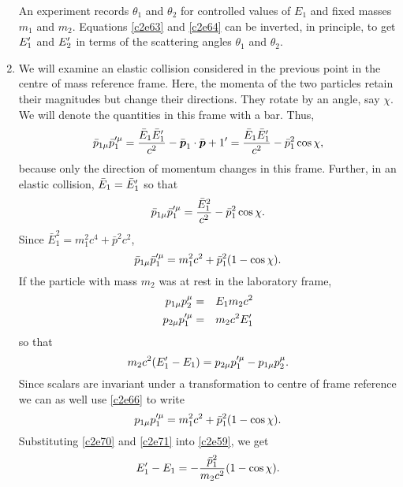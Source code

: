 \begin{enumerate}
An experiment records $\theta_1$ and $\theta_2$ for controlled values of $E_1$
and fixed masses $m_1$ and $m_2$. Equations \eqref{c2e63} and \eqref{c2e64}
can be inverted, in principle, to get $E_1^\prime$ and $E_2^\prime$ in terms of
the scattering angles $\theta_1$ and $\theta_2$.

\item We will examine an elastic collision considered in the previous point in 
the centre of mass reference frame. Here, the momenta of the two particles retain
their magnitudes but change their directions. They rotate by an angle, say $\chi$.
We will denote the quantities in this frame with a bar. Thus,
\begin{equation}\label{c2e65}
\bar{p}_{1\mu}\bar{p}_1^{\prime\mu} = \frac{\bar{E}_1\bar{E}_1^\prime}{c^2} - 
\bar{\boldsymbol{p}}_1\cdot\bar{\boldsymbol{p}}+1^\prime = \frac{\bar{E}_1\bar{E}_1^\prime}{c^2} - 
\bar{p}^2_1\cos\chi,
\end{equation}
because only the direction of momentum changes in this frame. Further, in an
elastic collision, $\bar{E}_1 = \bar{E}_1^\prime$ so that
\begin{equation}\label{c2e66}
\bar{p}_{1\mu}\bar{p}_1^{\prime\mu} = \frac{\bar{E}_1^2}{c^2} - \bar{p}_1^2\cos\chi.
\end{equation}
Since $\bar{E}_1^2 = m_1^2c^4 + \bar{p}^2c^2$, 
\begin{equation}\label{c2e67}
\bar{p}_{1\mu}\bar{p}_1^{\prime\mu} = m_1^2c^2 + \bar{p}_1^2(1 - \cos\chi).
\end{equation}
If the particle with mass $m_2$ was at rest in the laboratory frame,
\begin{eqnarray}
p_{1\mu}p_2^\mu &=& E_1m_2c^2 \label{c2e68} \\
p_{2\mu}p_1^{\prime\mu} &=& m_2c^2 E_1^\prime \label{c2e69}
\end{eqnarray}
so that
\begin{equation}\label{c2e70}
m_2c^2(E_1^\prime - E_1) = p_{2\mu}p_1^{\prime\mu} - p_{1\mu}p_2^\mu.
\end{equation}
Since scalars are invariant under a transformation to centre of frame reference
we can as well use \eqref{c2e66} to write
\begin{equation}\label{c2e71}
p_{1\mu}p_1^{\prime\mu} = m_1^2c^2 + \bar{p}_1^2(1 - \cos\chi).
\end{equation}
Substituting \eqref{c2e70} and \eqref{c2e71} into \eqref{c2e59}, we get
\begin{equation}\label{c2e72}
E_1^\prime - E_1 = -\frac{\bar{p}_1^2}{m_2c^2}(1 - \cos\chi).
\end{equation}

\end{enumerate}
